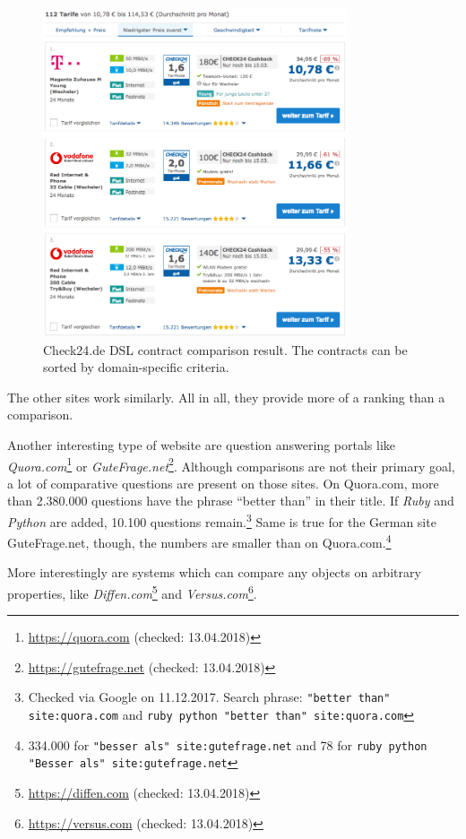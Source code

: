 \begin{figure}[tbp]
 \centering
	\includegraphics[width=0.8\textwidth]{images/ds-sys/check24_2}
	\caption{Check24.de DSL contract comparison result. The contracts can be sorted by domain-specific criteria.}
	\label{img:check24_2}
\end{figure}
The other sites work similarly. All in all, they provide more of a ranking than a comparison.


Another interesting type of website are question answering portals like \emph{Quora.com}\footnote{\url{https://quora.com} (checked: 13.04.2018)} or \emph{GuteFrage.net}\footnote{\url{https://gutefrage.net} (checked: 13.04.2018)}. Although comparisons are not their primary goal, a lot of comparative questions are present on those sites.
On Quora.com, more than 2.380.000 questions have the phrase \enquote{better than} in their title. If \emph{Ruby} and \emph{Python} are added, 10.100 questions remain.\footnote{Checked via Google on 11.12.2017. Search phrase: \texttt{"better than" site:quora.com} and \texttt{ruby python "better than" site:quora.com}}
Same is true for the German site GuteFrage.net, though, the numbers are smaller than on Quora.com.\footnote{334.000 for \texttt{"besser als" site:gutefrage.net} and 78 for \texttt{ruby python "Besser als" site:gutefrage.net}}

More interestingly are systems which can compare any objects on arbitrary properties, like \emph{Diffen.com}\footnote{\url{https://diffen.com} (checked: 13.04.2018)} and \emph{Versus.com}\footnote{\url{https://versus.com} (checked: 13.04.2018)}.


